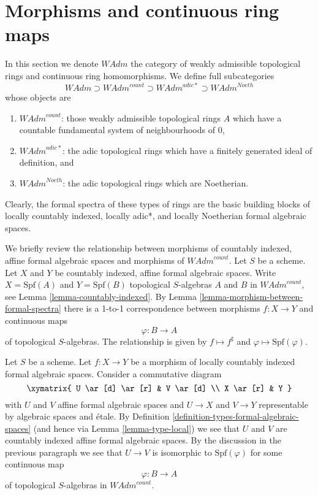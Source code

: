 \section{Morphisms and continuous ring maps}
\label{section-morphisms-rings}

\noindent
In this section we denote $\textit{WAdm}$ the category of
weakly admissible topological rings and continuous ring homomorphisms.
We define full subcategories
$$
\textit{WAdm} \supset \textit{WAdm}^{count} \supset
\textit{WAdm}^{adic*} \supset \textit{WAdm}^{Noeth}
$$
whose objects are
\begin{enumerate}
\item $\textit{WAdm}^{count}$: those weakly admissible topological rings
$A$ which have a countable fundamental system of neighbourhoods of $0$,
\item $\textit{WAdm}^{adic*}$: the adic topological rings which have
a finitely generated ideal of definition, and
\item $\textit{WAdm}^{Noeth}$: the adic topological rings which
are Noetherian.
\end{enumerate}
Clearly, the formal spectra of these types of rings are the basic
building blocks of locally countably indexed, locally adic*, and
locally Noetherian formal algebraic spaces.

\medskip\noindent
We briefly review the relationship between morphisms of
countably indexed, affine formal algebraic spaces and
morphisms of $\textit{WAdm}^{count}$.
Let $S$ be a scheme. Let $X$ and $Y$ be countably indexed,
affine formal algebraic spaces. Write $X = \text{Spf}(A)$
and $Y = \text{Spf}(B)$ topological $S$-algebras
$A$ and $B$ in $\textit{WAdm}^{count}$, see
Lemma \ref{lemma-countably-indexed}.
By Lemma \ref{lemma-morphism-between-formal-spectra}
there is a 1-to-1 correspondence between morphisms
$f : X \to Y$ and continuous maps
$$
\varphi : B \longrightarrow A
$$
of topological $S$-algebras. The relationship is given by
$f \mapsto f^\sharp$ and $\varphi \mapsto \text{Spf}(\varphi)$.

\medskip\noindent
Let $S$ be a scheme. Let $f : X \to Y$ be a morphism of
locally countably indexed formal algebraic spaces. Consider a
commutative diagram
$$
\xymatrix{
U \ar[d] \ar[r] & V \ar[d] \\
X \ar[r] & Y
}
$$
with $U$ and $V$ affine formal algebraic spaces and $U \to X$ and $V \to Y$
representable by algebraic spaces and \'etale. By
Definition \ref{definition-types-formal-algebraic-spaces} (and hence via
Lemma \ref{lemma-type-local}) we see that $U$ and $V$ are countably indexed
affine formal algebraic spaces. By the discussion in the previous
paragraph we see that $U \to V$ is isomorphic to $\text{Spf}(\varphi)$
for some continuous map
$$
\varphi : B \longrightarrow A
$$
of topological $S$-algebras in $\textit{WAdm}^{count}$.

